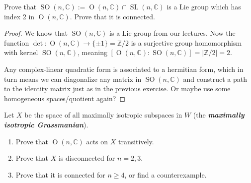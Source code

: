 \documentclass{article}
\newcommand{\Z}{\mathbb{Z}}
\newcommand{\C}{\mathbb{C}}
\renewcommand{\O}{\operatorname{O}}
\DeclareMathOperator{\SL}{SL}
\DeclareMathOperator{\SO}{SO}
\begin{document}
\begin{exercise}
	Prove that $\SO(n, \C) := \O(n, \C) \cap \SL(n, \C)$ is a Lie group
	which has index 2 in $\O(n, \C)$. Prove that it is connected.
\end{exercise}
\begin{proof}
	We know  that $\SO(n,\C)$ is a Lie group from our lectures. Now the function $\det:\O(n,\C)\to\{\pm1\}=\Z/2$ is a surjective group homomorphism with kernel $\SO(n,\C)$, meaning $[\O(n,\C):\SO(n,\C)]=|\Z/2|=2$.
	
	Any complex-linear quadratic form is associated to a hermitian form, which in turn means we can diagonalize any matrix in $\SO(n,\C)$ and construct a path to the identity matrix just as in the previous exercise. {\color{red}Or maybe use some homogeneous spaces/quotient again?}
\end{proof}

\begin{exercise}
	Let $X$ be the space of all maximally isotropic subspaces in $W$ (the \textbf{\textit{maximally isotropic Grassmanian}}).
	\begin{enumerate}[label*=(\alph*)]
		\item Prove that $\O(n,\C)$ acts on $X$ transitively.
		\item Prove that $X$ is disconnected for $n=2,3$.
		\item Prove that it is connected for $n\geq4$, or find a counterexample.
	\end{enumerate}
\end{exercise}
\end{document}
